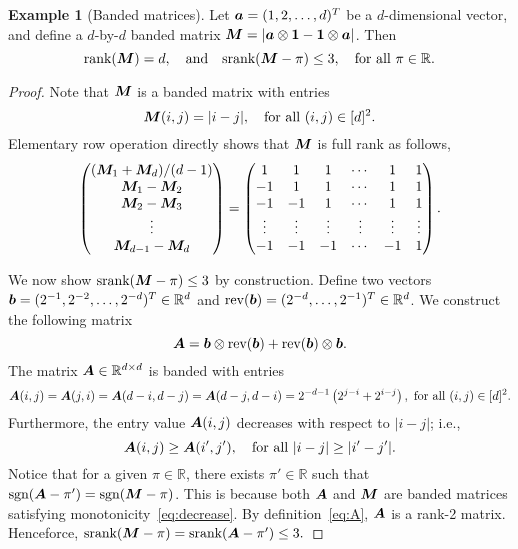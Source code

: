 \documentclass[11pt]{article}
\theoremstyle{plain}
\theoremstyle{definition}
\newtheorem{example}{Example}
\def\sign{\textup{sgn}}
\def\srank{\textup{srank}}
\def\rank{\textup{rank}}
\begin{document}
\begin{example}[Banded matrices]\label{example:banded} Let $\bm{a}=(1,2,\ldots,d)^T$ be a $d$-dimensional vector, and define a $d$-by-$d$ banded matrix $\bm M=|\bm{a}\otimes \mathbf{1}-\mathbf{1}\otimes \bm{a}|$. Then
\[
\rank(\mM)=d,\quad \text{and}\quad \srank(\mM-\pi)\leq 3, \quad \text{for all }\pi\in \mathbb{R}.
\]
\end{example}
\begin{proof}
Note that $\bm M$ is a banded matrix with entries
\[
\bm M(i,j)={|i-j|}, \quad \text{for all }(i,j)\in[d]^2.
\]
Elementary row operation directly shows that $\bm M$ is full rank as follows,
\begin{align}
\begin{pmatrix}
(\bm M_1+\bm M_d)/(d-1)\\
\bm M_1-\bm M_2\\
\bm M_2-\bm M_3\\
\vdots\\
\bm M_{d-1}-\bm M_{d}
\end{pmatrix} = 
\begin{pmatrix}
1&1&1&\cdots&1&1\\
-1&1&1&\cdots&1&1\\
-1&-1&1&\cdots&1&1\\
\vdots & \vdots & \vdots & \vdots & \vdots & \vdots\\
-1&-1&-1&\cdots&-1&1
\end{pmatrix}.
\end{align}

We now show $\srank(\mM-\pi)\leq 3$ by construction. Define two vectors $\bm{b}=(2^{-1},2^{-2},\ldots,2^{-d})^T\in\mathbb{R}^d$ and $\text{rev}(\bm{b})=(2^{-d},\ldots,2^{-1})^T\in\mathbb{R}^d$. We construct the following matrix
\begin{equation}\label{eq:A}
\bm A=\bm{b}\otimes\text{rev}(\bm{b})+\text{rev}(\bm{b})\otimes\bm{b}.
\end{equation}
The matrix $\bm A\in\mathbb{R}^{d\times d}$ is banded with entries
\[
\mA(i,j)=\mA(j,i)=\mA(d-i,d-j)=\mA(d-j,d-i)=2^{-d-1}\left(2^{j-i}+2^{i-j}\right),\ \text{for all }(i,j)\in[d]^2.
\] 
Furthermore, the entry value $\bm A(i,j)$ decreases with respect to $|i-j|$; i.e., 
\begin{equation}\label{eq:decrease}
\bm A(i,j) \geq \bm A(i',j'), \quad \text{for all }|i-j|\geq |i'-j'|.
\end{equation}
Notice that for a given $\pi\in\mathbb{R}$, there exists $\pi'\in\mathbb{R}$ such that $\sign(\mA-\pi')=\sign(\mM-\pi)$. This is because both $\bm A$ and $\bm M$ are banded matrices satisfying monotonicity~\eqref{eq:decrease}. By definition~\eqref{eq:A}, $\bm A$ is a rank-2 matrix. Henceforce, $\srank(\mM-\pi)=\srank(\mA-\pi')\leq 3.$
\end{proof}
\end{document}
